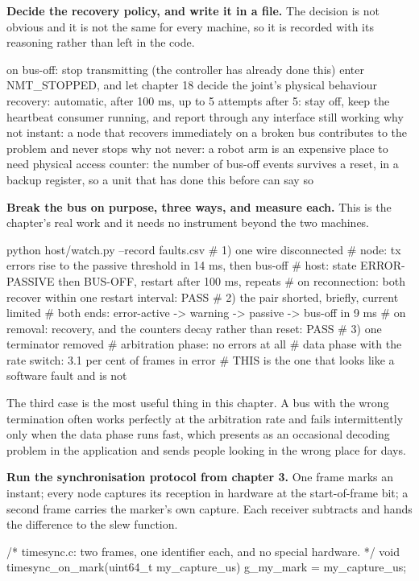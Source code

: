 \begin{steps}
\item \textbf{Decide the recovery policy, and write it in a file.} The decision
is not obvious and it is not the same for every machine, so it is recorded with
its reasoning rather than left in the code.
\begin{plaincode}
on bus-off:      stop transmitting (the controller has already done this)
                 enter NMT_STOPPED, and let chapter 18 decide the joint's
                 physical behaviour
recovery:        automatic, after 100 ms, up to 5 attempts
after 5:         stay off, keep the heartbeat consumer running, and report
                 through any interface still working
why not instant: a node that recovers immediately on a broken bus contributes
                 to the problem and never stops
why not never:   a robot arm is an expensive place to need physical access
counter:         the number of bus-off events survives a reset, in a backup
                 register, so a unit that has done this before can say so
\end{plaincode}

\item \textbf{Break the bus on purpose, three ways, and measure each.} This is
the chapter's real work and it needs no instrument beyond the two machines.
\begin{shellcode}
python host/watch.py --record faults.csv
# 1) one wire disconnected
#    node: tx errors rise to the passive threshold in 14 ms, then bus-off
#    host: state ERROR-PASSIVE then BUS-OFF, restart after 100 ms, repeats
#    on reconnection: both recover within one restart interval: PASS
# 2) the pair shorted, briefly, current limited
#    both ends: error-active -> warning -> passive -> bus-off in 9 ms
#    on removal: recovery, and the counters decay rather than reset: PASS
# 3) one terminator removed
#    arbitration phase: no errors at all
#    data phase with the rate switch: 3.1 per cent of frames in error
#    THIS is the one that looks like a software fault and is not
\end{shellcode}
The third case is the most useful thing in this chapter. A bus with the wrong
termination often works perfectly at the arbitration rate and fails
intermittently only when the data phase runs fast, which presents as an
occasional decoding problem in the application and sends people looking in the
wrong place for days.

\item \textbf{Run the synchronisation protocol from chapter 3.} One frame marks
an instant; every node captures its reception in hardware at the start-of-frame
bit; a second frame carries the marker's own capture. Each receiver subtracts
and hands the difference to the slew function.
\begin{ccode}
/* timesync.c: two frames, one identifier each, and no special hardware. */
void timesync_on_mark(uint64_t my_capture_us)   { g_my_mark = my_capture_us; }


\end{ccode}
\end{steps}
